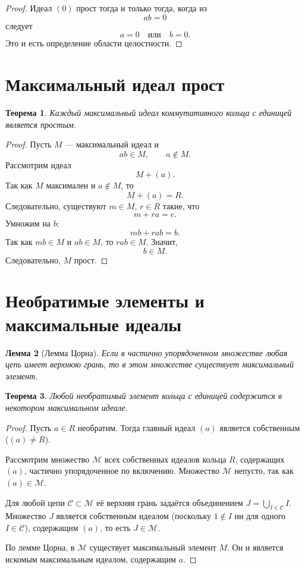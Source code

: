 \documentclass[12pt, a4paper]{article}
\newtheorem{theorem}{Теорема}
\newtheorem{lemma}[theorem]{Лемма}
\theoremstyle{definition}
\theoremstyle{remark}
\begin{document}
\begin{proof}
	Идеал $(0)$ прост тогда и только тогда, когда из
	\[
	ab=0
	\]
	следует
	\[
	a=0 \quad \text{или}\quad b=0.
	\]
	Это и есть определение области целостности.
\end{proof}

\section{Максимальный идеал прост}

\begin{theorem}
	Каждый максимальный идеал коммутативного кольца с единицей является простым.
\end{theorem}

\begin{proof}
	Пусть $M$ --- максимальный идеал и
	\[
	ab\in M,\qquad a\notin M.
	\]
	Рассмотрим идеал
	\[
	M+(a).
	\]
	Так как $M$ максимален и $a\notin M$, то
	\[
	M+(a)=R.
	\]
	Следовательно, существуют $m\in M$, $r\in R$ такие, что
	\[
	m+ra=e.
	\]
	Умножим на $b$:
	\[
	mb+rab=b.
	\]
	Так как $mb\in M$ и $ab\in M$, то $rab\in M$. Значит,
	\[
	b\in M.
	\]
	Следовательно, $M$ прост.
\end{proof}

\section{Необратимые элементы и максимальные идеалы}

\begin{lemma}[Лемма Цорна]
	Если в частично упорядоченном множестве любая цепь имеет верхнюю грань, то в этом множестве существует максимальный элемент.
\end{lemma}

\begin{theorem}
	Любой необратимый элемент кольца с единицей содержится в некотором максимальном идеале.
\end{theorem}

\begin{proof}
	Пусть $a \in R$ необратим. Тогда главный идеал $(a)$ является собственным ($(a) \neq R$). 
	
	Рассмотрим множество $\mathcal{M}$ всех собственных идеалов кольца $R$, содержащих $(a)$, частично упорядоченное по включению. Множество $\mathcal{M}$ непусто, так как $(a) \in \mathcal{M}$.
	
	Для любой цепи $\mathcal{C} \subset \mathcal{M}$ её верхняя грань задаётся объединением $J = \bigcup_{I \in \mathcal{C}} I$. Множество $J$ является собственным идеалом (поскольку $1 \notin I$ ни для одного $I \in \mathcal{C}$), содержащим $(a)$, то есть $J \in \mathcal{M}$.
	
	По лемме Цорна, в $\mathcal{M}$ существует максимальный элемент $M$. Он и является искомым максимальным идеалом, содержащим $a$.
\end{proof}
\end{document}
